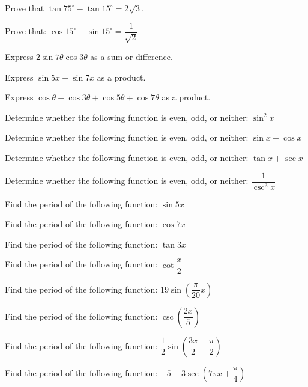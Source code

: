 \documentclass[11pt,a4paper]{article}
\begin{document}
\begin{shortlist}
\item Prove that $\tan75^{\circ}-\tan15^{\circ} = 2\sqrt{3}$.

\item Prove that: $\cos15^{\circ}-\sin15^{\circ} = \dfrac{1}{\sqrt{2}}$

\item Express $2\sin7\theta\cos3\theta$ as a sum or difference.

\item Express $\sin5x+\sin7x$ as a product.

\item Express $\cos\theta+\cos3\theta+\cos5\theta+\cos7\theta$ as a product.

\item Determine whether the following function is even, odd, or neither: $\sin^2x$

\item Determine whether the following function is even, odd, or neither: $\sin x+\cos x$

\item Determine whether the following function is even, odd, or neither: $\tan x+\sec x$

\item Determine whether the following function is even, odd, or neither: $\dfrac{1}{\csc^3x}$

\item Find the period of the following function: $\sin5x$

\item Find the period of the following function: $\cos7x$

\item Find the period of the following function: $\tan3x$

\item Find the period of the following function: $\cot\dfrac{x}{2}$

\item Find the period of the following function: $19\sin\left(\dfrac{\pi}{20}x\right)$

\item Find the period of the following function: $\csc\left(\dfrac{2x}{5}\right)$

\item Find the period of the following function: $\dfrac{1}{2}\sin\left(\dfrac{3x}{2}-\dfrac{\pi}{2}\right)$

\item Find the period of the following function: $-5-3\sec\left(7\pi x+\dfrac{\pi}{4}\right)$


\end{shortlist}
\end{document}
